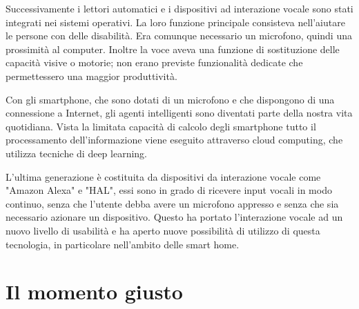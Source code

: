 \documentclass[twoside]{supsistudent}
\begin{document}
Successivamente i lettori automatici e i dispositivi ad interazione vocale sono stati integrati nei sistemi operativi. La loro funzione principale consisteva nell'aiutare le persone con delle disabilità. Era comunque necessario un microfono, quindi una prossimità al computer. Inoltre la voce aveva una funzione di sostituzione delle capacità visive o motorie; non erano previste funzionalità dedicate che permettessero una maggior produttività.

Con gli smartphone, che sono dotati di un microfono e che dispongono di una connessione a Internet, gli agenti intelligenti sono diventati parte della nostra vita quotidiana. Vista la limitata capacità di calcolo degli smartphone tutto il processamento dell'informazione viene eseguito attraverso cloud computing, che utilizza tecniche di deep learning. \cite{deeplearninggeneral}

L'ultima generazione è costituita da dispositivi da interazione vocale come "Amazon Alexa" e "HAL", essi sono in grado di ricevere input vocali in modo continuo, senza che l'utente debba avere un microfono appresso e senza che sia necessario azionare un dispositivo. Questo ha portato l'interazione vocale ad un nuovo livello di usabilità e ha aperto nuove possibilità di utilizzo di questa tecnologia, in particolare nell'ambito delle smart home.

\section{Il momento giusto}
\end{document}
